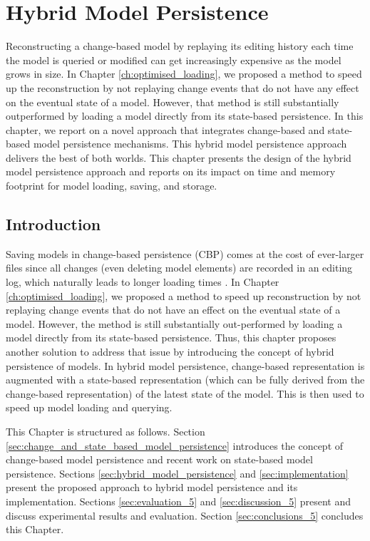 \chapter{Hybrid Model Persistence}
\label{ch:hybrid_model_persistence}

Reconstructing a change-based model by replaying its editing history each time the model is queried or modified can get increasingly expensive as the model grows in size. In Chapter \ref{ch:optimised_loading}, we proposed a method to speed up the reconstruction by not replaying change events that do not have any effect on the eventual state of a model. However, that method is still substantially outperformed by loading a model directly from its state-based persistence. In this chapter, we report on a novel approach that integrates change-based and state-based model persistence mechanisms. This hybrid model persistence approach delivers the best of both worlds. This chapter presents the design of the hybrid model persistence approach and reports on its impact on time and memory footprint for model loading, saving, and storage.

\section{Introduction}
\label{sec:introduction_5}
Saving models in change-based persistence (CBP) comes at the cost of ever-larger files \cite{DBLP:conf/edoc/KoegelHLHD10,DBLP:journals/entcs/RobbesL07} since all changes (even deleting model elements) are recorded in an editing log, which naturally leads to longer loading times \cite{mens2002state}.
In Chapter \ref{ch:optimised_loading}, we proposed a method to speed up reconstruction by not replaying change events that do not have an effect on the eventual state of a model. However, the method is still substantially out-performed by loading a model directly from its state-based persistence. Thus, this chapter proposes another solution to address that issue by introducing the concept of hybrid persistence of models. In hybrid model persistence, change-based representation is augmented with a state-based representation (which can be fully derived from the change-based representation) of the latest state of the model. This is then used to speed up model loading and querying.

This Chapter is structured as follows. Section \ref{sec:change_and_state_based_model_persistence} introduces the concept of change-based model persistence and recent work on state-based model persistence. Sections \ref{sec:hybrid_model_persistence} and \ref{sec:implementation} present the proposed approach to hybrid model persistence and its implementation. Sections \ref{sec:evaluation_5} and \ref{sec:discussion_5} present and discuss experimental results and evaluation. Section \ref{sec:conclusions_5} concludes this Chapter.

